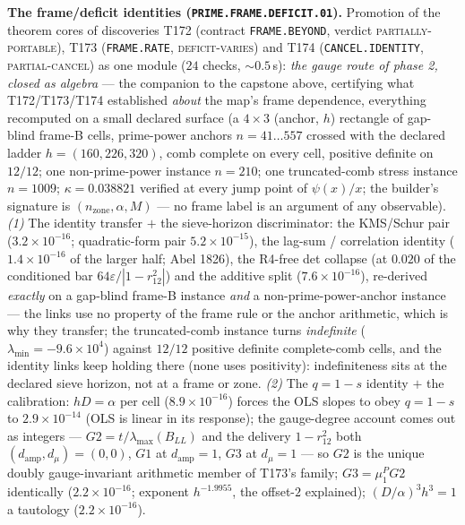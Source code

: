 \documentclass[11pt,a4paper]{article}
\begin{document}
\par\smallskip\noindent\textbf{The frame/deficit identities
(\texttt{PRIME.FRAME.DEFICIT.01}).}
Promotion of the theorem cores of discoveries T172 (contract
\texttt{FRAME.BEYOND}, verdict \textsc{partially-portable}), T173
(\texttt{FRAME.RATE}, \textsc{deficit-varies}) and T174
(\texttt{CANCEL.IDENTITY}, \textsc{partial-cancel}) as one module ($24$
checks, ${\sim}0.5$\,s): \emph{the gauge route of phase 2, closed as
algebra} --- the companion to the capstone above, certifying what
T172/T173/T174 established \emph{about} the map's frame dependence,
everything recomputed on a small declared surface (a $4\times3$
(anchor, $h$) rectangle of gap-blind frame-B cells, prime-power anchors
$n=41\ldots557$ crossed with the declared ladder $h=(160,226,320)$,
comb complete on every cell, positive definite on $12/12$; one
non-prime-power instance $n=210$; one truncated-comb stress instance
$n=1009$; $\kappa=0.038821$ verified at every jump point of
$\psi(x)/x$; the builder's signature is
$(n_{\mathrm{zone}},\alpha,M)$ --- no frame label is an argument of any
observable).
\emph{(1)} The identity transfer $+$ the sieve-horizon discriminator:
the KMS/Schur pair ($3.2\times10^{-16}$; quadratic-form pair
$5.2\times10^{-15}$), the lag-sum / correlation identity
($1.4\times10^{-16}$ of the larger half; Abel 1826), the R4-free det
collapse (at $0.020$ of the conditioned bar
$64\varepsilon/|1-r_{12}^2|$) and the additive split
($7.6\times10^{-16}$), re-derived \emph{exactly} on a gap-blind frame-B
instance \emph{and} a non-prime-power-anchor instance --- the links use
no property of the frame rule or the anchor arithmetic, which is why
they transfer; the truncated-comb instance turns \emph{indefinite}
($\lambda_{\min}=-9.6\times10^{4}$) against $12/12$ positive definite
complete-comb cells, and the identity links keep holding there (none
uses positivity): indefiniteness sits at the declared sieve horizon,
not at a frame or zone.
\emph{(2)} The $q=1-s$ identity $+$ the calibration: $hD=\alpha$ per
cell ($8.9\times10^{-16}$) forces the OLS slopes to obey $q=1-s$ to
$2.9\times10^{-14}$ (OLS is linear in its response); the gauge-degree
account comes out as integers --- $G2=t/\lambda_{\max}(B_{LL})$ and the
delivery $1-r_{12}^2$ both $(d_{\mathrm{amp}},d_\mu)=(0,0)$, $G1$ at
$d_{\mathrm{amp}}=1$, $G3$ at $d_\mu=1$ --- so $G2$ is the unique
doubly gauge-invariant arithmetic member of T173's family;
$G3=\mu^P_1G2$ identically ($2.2\times10^{-16}$; exponent
$h^{-1.9955}$, the offset-$2$ explained); $(D/\alpha)^3h^3=1$ a
tautology ($2.2\times10^{-16}$).
\end{document}
